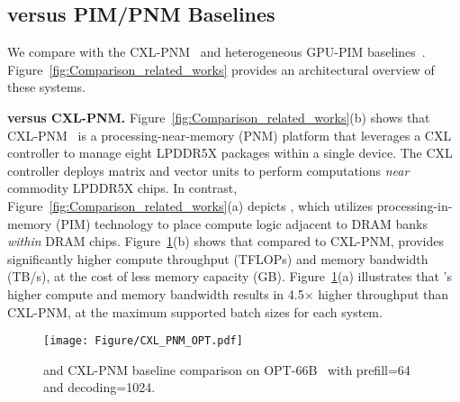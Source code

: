 \subsection{\att{} versus PIM/PNM Baselines}


We compare \att{} with the \sota{} CXL-PNM~\cite{cxl-pnm} and heterogeneous GPU-PIM baselines~\cite{AttAcc, NeuPIM}. Figure~\ref{fig:Comparison_related_works} provides an architectural overview of these systems. 







\textbf{\att{} versus CXL-PNM.} Figure~\ref{fig:Comparison_related_works}(b) shows that CXL-PNM~\cite{cxl-pnm, samsung_pimpnm} is a processing-near-memory (PNM) platform that leverages a CXL controller to manage eight LPDDR5X packages within a single device. The CXL controller deploys matrix and vector units to perform computations \emph{near} commodity LPDDR5X chips. 
In contrast, Figure~\ref{fig:Comparison_related_works}(a) depicts \att{}, which utilizes processing-in-memory (PIM) technology to place compute logic adjacent to DRAM banks \emph{within} DRAM chips. Figure~\ref{fig:CXL_PNM_OPT}(b) shows that compared to CXL-PNM, \att{} provides significantly higher compute throughput (TFLOPs) and memory bandwidth (TB/s), at the cost of less memory capacity (GB).
Figure~\ref{fig:CXL_PNM_OPT}(a) illustrates that \att{}'s higher compute and memory bandwidth results in 4.5$\times$ higher throughput than CXL-PNM, at the maximum supported batch sizes for each system.

\begin{figure}[h]
	\centering
  	\texttt{[image: Figure/CXL\_PNM\_OPT.pdf]}
    \caption{\att{} and CXL-PNM baseline comparison on OPT-66B~\cite{opt} with prefill=64 and decoding=1024.}
	\label{fig:CXL_PNM_OPT}
\end{figure}

